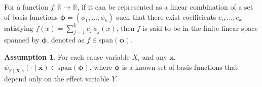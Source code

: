 \documentclass{article}
\theoremstyle{plain}
\theoremstyle{definition}
\newtheorem{assumption}[theorem]{Assumption}
\theoremstyle{remark}
\begin{document}
\begin{table}[t]
\caption{The functional forms of FCMs and their corresponding QPE forms. For HNM, $b>0$, and for PNL, $\overline{g}=g'(g^{-1})$. The QPEs of these FCMs can all be expressed in finite-rank forms.}
\vspace{-3mm}
\label{tab:fcm-qpe-basis}
\begin{center}
\end{center}
\end{table}%

For a function $f:\mathbb{R}\to\mathbb{R}$, if it can be represented as a linear combination of a set of basis functions $\bm{\phi}=(\phi_1,\dots,\phi_k)$ such that there exist coefficients $c_i,\dots,c_k$ satisfying $f(x)=\sum_{j=1}^k c_j\,\phi_j(x)$, then $f$ is said to be in the finite linear space spanned by $\bm{\phi}$, denoted as $f\in\text{span}(\bm{\phi})$.

\begin{assumption}
\label{assum:finit-span}
For each cause variable $X_i$ and any $\bm{x}$, $\psi_{Y\mid\bm{X},i}(\cdot\!\mid\!\bm{x})\in\text{span}(\bm{\phi})$, where $\bm{\phi}$ is a known set of basis functions that depend only on the effect variable $Y$.
\end{assumption}
\end{document}
